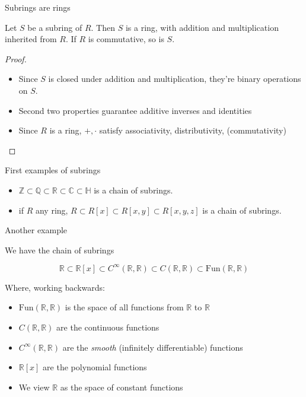 \documentclass{beamer}
\begin{document}
\begin{frame}{Subrings are rings}

\begin{lemma}
Let $S$ be a subring of $R$.  Then $S$ is a ring, with addition and multiplication inherited from $R$.  If $R$ is commutative, so is $S$.
\end{lemma}

\begin{proof}
\begin{itemize}
\item Since $S$ is closed under addition and multiplication, they're binary operations on $S$.
\item Second two properties guarantee additive inverses and identities
\item Since $R$ is a ring, $+,\cdot$ satisfy associativity, distributivity, (commutativity)
\end{itemize}
\end{proof}
\end{frame}

\begin{frame}{First examples of subrings}

\begin{itemize}
\item $\mathbb{Z}\subset\mathbb{Q}\subset \mathbb{R}\subset\mathbb{C}\subset\mathbb{H}$ is a chain of subrings.
\item if $R$ any ring, $R\subset R[x]\subset R[x,y]\subset R[x,y,z]$ is a chain of subrings.
\end{itemize}
\end{frame}

\begin{frame}{Another example}

We have the chain of subrings 

$$\mathbb{R}\subset \mathbb{R}[x]\subset C^\infty(\mathbb{R},\mathbb{R})\subset C(\mathbb{R},\mathbb{R}) \subset \textrm{Fun}(\mathbb{R},\mathbb{R})$$

Where, working backwards:
\begin{itemize}
\item $\textrm{Fun}(\mathbb{R},\mathbb{R})$ is the space of all functions from $\mathbb{R}$ to $\mathbb{R}$
\item $C(\mathbb{R},\mathbb{R})$ are the continuous functions
\item $C^\infty(\mathbb{R},\mathbb{R})$ are the \emph{smooth} (infinitely differentiable) functions
\item $\mathbb{R}[x]$ are the polynomial functions
\item We view $\mathbb{R}$ as the space of constant functions 
\end{itemize}

\end{frame}
\end{document}
